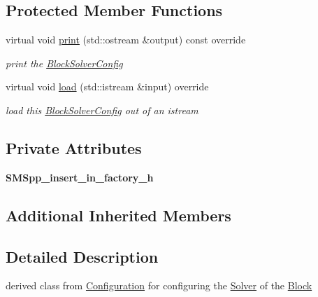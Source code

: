 \subsection*{Protected Member Functions}
\begin{DoxyCompactItemize}
\item 
\mbox{\label{class_s_m_spp__di__unipi__it_1_1_block_solver_config_a59a9fcbf8f9f86d348344b2073644b0e}} 
virtual void \mbox{\hyperlink{class_s_m_spp__di__unipi__it_1_1_block_solver_config_a59a9fcbf8f9f86d348344b2073644b0e}{print}} (std\+::ostream \&output) const override
\begin{DoxyCompactList}\small\item\em print the \mbox{\hyperlink{class_s_m_spp__di__unipi__it_1_1_block_solver_config}{Block\+Solver\+Config}} \end{DoxyCompactList}\item 
virtual void \mbox{\hyperlink{class_s_m_spp__di__unipi__it_1_1_block_solver_config_a019850055afe817b816bae5699f461d3}{load}} (std\+::istream \&input) override
\begin{DoxyCompactList}\small\item\em load this \mbox{\hyperlink{class_s_m_spp__di__unipi__it_1_1_block_solver_config}{Block\+Solver\+Config}} out of an istream \end{DoxyCompactList}\end{DoxyCompactItemize}
\subsection*{Private Attributes}
\begin{DoxyCompactItemize}
\item 
\mbox{\label{class_s_m_spp__di__unipi__it_1_1_block_solver_config_a5618a1c2a09ff7cd62e4de9df7956672}} 
{\bfseries S\+M\+Spp\+\_\+insert\+\_\+in\+\_\+factory\+\_\+h}
\end{DoxyCompactItemize}
\subsection*{Additional Inherited Members}


\subsection{Detailed Description}
derived class from \mbox{\hyperlink{class_s_m_spp__di__unipi__it_1_1_configuration}{Configuration}} for configuring the \mbox{\hyperlink{class_s_m_spp__di__unipi__it_1_1_solver}{Solver}} of the \mbox{\hyperlink{class_s_m_spp__di__unipi__it_1_1_block}{Block}} 

